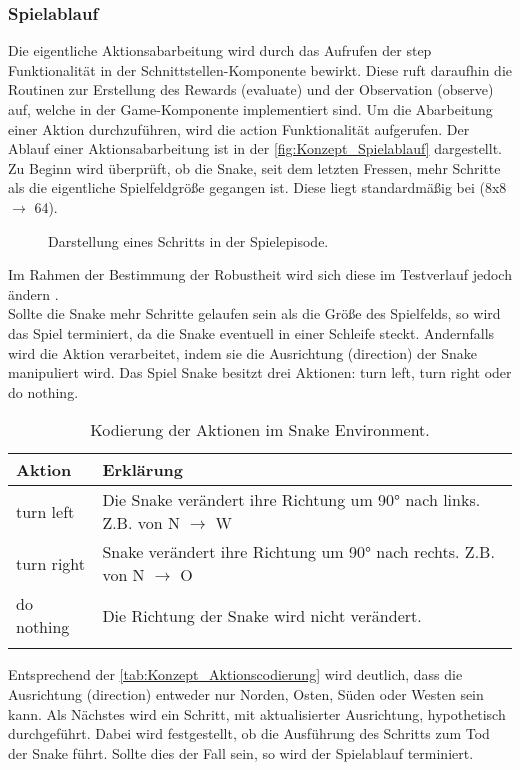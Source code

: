 \subsubsection{Spielablauf} \label{subsubsec:Konzept_Spielablauf}
Die eigentliche Aktionsabarbeitung wird durch das Aufrufen der step Funktionalität in der Schnittstellen-Komponente  bewirkt. Diese ruft daraufhin die Routinen zur Erstellung des Rewards (evaluate) und der Observation (observe) auf, welche in der Game-Komponente implementiert sind.
Um die Abarbeitung einer Aktion durchzuführen, wird die action Funktionalität aufgerufen. Der Ablauf einer Aktionsabarbeitung ist in der \autoref{fig:Konzept_Spielablauf} dargestellt. Zu Beginn wird überprüft, ob die Snake, seit dem letzten Fressen, mehr Schritte als die eigentliche Spielfeldgröße gegangen ist. Diese liegt standardmäßig bei (8x8 $\longrightarrow$ 64).
\begin{figure}[H]
	\centering
	
	\caption[Spielablauf]{Darstellung eines Schritts in der Spielepisode.}
	\label{fig:Konzept_Spielablauf}
\end{figure}
Im Rahmen der Bestimmung der Robustheit wird sich diese im Testverlauf jedoch ändern .\\
Sollte die Snake mehr Schritte gelaufen sein als die Größe des Spielfelds, so wird das Spiel terminiert, da die Snake eventuell in einer Schleife steckt.
Andernfalls wird die Aktion verarbeitet, indem sie die Ausrichtung (direction) der Snake manipuliert wird. Das Spiel Snake besitzt drei Aktionen: turn left, turn right oder do nothing.
\begin{longtable}[h]{|p{3cm}|p{\linewidth - 4cm}|}
	\hline
	Aktion & Erklärung \\
	\hline
	turn left & Die Snake verändert ihre Richtung um 90° nach links. Z.B. von N $\longrightarrow$ W \\
	\hline
	turn right & Snake verändert ihre Richtung um 90° nach rechts. Z.B. von N $\longrightarrow$ O \\
	\hline
	do nothing & Die Richtung der Snake wird nicht verändert. \\
	\hline
	\caption{Kodierung der Aktionen im Snake Environment.}
	\label{tab:Konzept_Aktionscodierung} 
\end{longtable}
Entsprechend der \autoref{tab:Konzept_Aktionscodierung} wird deutlich, dass die Ausrichtung (direction) entweder nur Norden, Osten, Süden oder Westen sein kann.
Als Nächstes wird ein Schritt, mit aktualisierter Ausrichtung, hypothetisch durchgeführt. Dabei wird festgestellt, ob die Ausführung des Schritts zum Tod der Snake führt. Sollte dies der Fall sein, so wird der Spielablauf terminiert.
